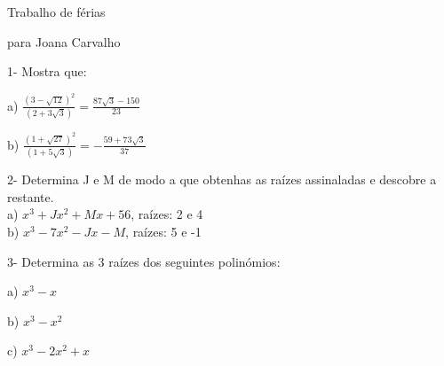 \documentclass[11pt]{article}
\begin{document}
\begin{center}
{\huge Trabalho de férias}
\end{center}
\begin{center}
{\huge para Joana Carvalho}
\end{center}
\vspace{10mm}

{\large 1- Mostra que:}
\begin{multicols}{2}
a) $ \frac {(3 - \sqrt{12})^{2} }  {(2 + 3 \sqrt{3} )}= \frac{87 \sqrt{3} - 150}{23}$

b) $ \frac {(1 + \sqrt{27})^{2} }  {(1 + 5 \sqrt{3} )}= -\frac{59 + 73 \sqrt{3}}{37}$\\
\end{multicols}
\vspace{5mm}

{\large 2- Determina J e M de modo a que obtenhas as raízes assinaladas e descobre a restante.}\\

a) $x^{3}+Jx^{2} + Mx+56$, raízes: 2 e 4\\

b) $x^3-7x^2-Jx-M$, raízes: 5 e -1\\
\vspace{5mm}

{\large 3- Determina as 3 raízes dos seguintes polinómios:}
\begin{multicols}{3}
a) $x^3-x$

b) $x^3-x^2$

c) $x^3-2x^2+x$
\end{multicols}
\end{document}
